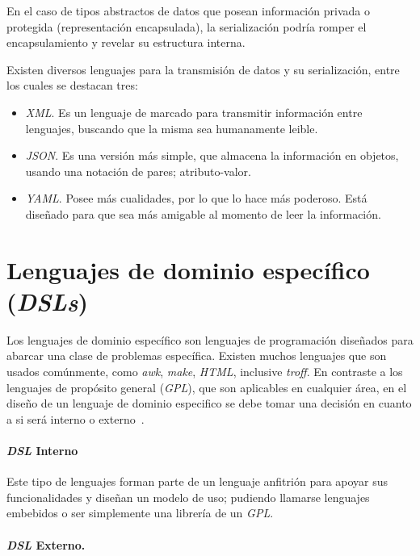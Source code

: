 \documentclass[12pt,letterpaper,titlepage,oneside,openright]{book}
\begin{document}
En el caso de tipos abstractos de datos que posean información privada o protegida (representación encapsulada), la serialización podría romper el encapsulamiento y revelar su estructura interna.


Existen diversos lenguajes para la transmisión de datos y su serialización, entre los cuales se destacan tres:

\begin{itemize}
    \item \textit{XML}. Es un lenguaje de marcado para transmitir información entre lenguajes, buscando que la misma sea humanamente leible.
    \item \textit{JSON}. Es una versión más simple, que almacena la información en objetos, usando una notación de pares; atributo-valor. 
    \item \textit{YAML}. Posee más cualidades, por lo que lo hace más poderoso. Está diseñado para que sea más amigable al momento de leer la información.
\end{itemize}

\section{Lenguajes de dominio específico (\textit{DSLs})}

Los lenguajes de dominio específico son lenguajes de programación diseñados para abarcar una clase de problemas específica. Existen muchos lenguajes que son usados comúnmente, como \textit{awk}, \textit{make}, \textit{HTML}, inclusive \textit{troff}. En contraste a los lenguajes de propósito general (\textit{GPL}), que son aplicables en cualquier área, en el diseño de un lenguaje de dominio especifico se debe tomar una decisión en cuanto a si será interno o externo~\cite{dlswork}.

\paragraph{\textit{DSL} Interno}

Este tipo de lenguajes forman parte de un lenguaje anfitrión para apoyar sus funcionalidades y diseñan un modelo de uso; pudiendo llamarse lenguajes embebidos o ser simplemente una librería de un \textit{GPL}.

\paragraph{\textit{DSL} Externo.}
\end{document}
